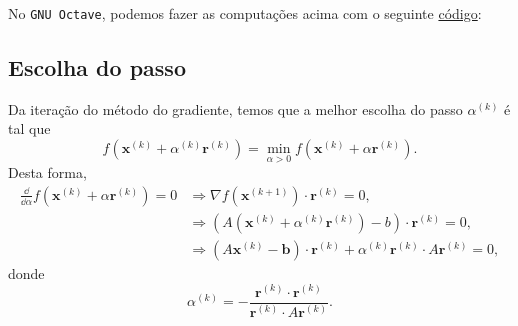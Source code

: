 \begin{ex}
\ifisoctave
No \verb+GNU Octave+, podemos fazer as computações acima com o seguinte \href{https://github.com/phkonzen/notas/blob/master/src/MatematicaNumerica/cap_sl_iter/dados/ex_metg_pc/ex_metg_pc.m}{código}:

\fi
\end{ex}

\subsection{Escolha do passo}

Da iteração do método do gradiente, temos que a melhor escolha do passo $\alpha^{(k)}$ é tal que
\begin{equation}
  f(\pmb{x}^{(k)}+\alpha^{(k)}\pmb{r}^{(k)}) = \min_{\alpha > 0} f(\pmb{x}^{(k)}+\alpha\pmb{r}^{(k)}).
\end{equation}
Desta forma,
\begin{align}
  \frac{\dd}{\dd \alpha}f(\pmb{x}^{(k)}+\alpha \pmb{r}^{(k)}) = 0 &\Rightarrow \nabla f(\pmb{x}^{(k+1)})\cdot \pmb{r}^{(k)} = 0,\\
  &\Rightarrow \left(A(\pmb{x}^{(k)}+\alpha^{(k)}\pmb{r}^{(k)})-b\right)\cdot\pmb{r}^{(k)} = 0,\\
  &\Rightarrow (A\pmb{x}^{(k)}-\pmb{b})\cdot\pmb{r}^{(k)}+\alpha^{(k)}\pmb{r}^{(k)}\cdot A\pmb{r}^{(k)} = 0,
\end{align}
donde
\begin{equation}
  \alpha^{(k)} = - \frac{\pmb{r}^{(k)}\cdot\pmb{r}^{(k)}}{\pmb{r}^{(k)}\cdot A\pmb{r}^{(k)}}.
\end{equation}

